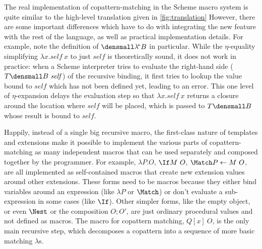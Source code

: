 
The real implementation of copattern-matching in the Scheme macro system is quite similar to the high-level translation given in \cref{fig:translation}
However, there are some important differences which have to do with integrating the new feature with the rest of the language, as well as practical implementation details.
For example, note the definition of $\den{\lamstar B}$ in particular.
While the $\eta$-equality simplifying $\lambda x. \mathit{self} ~ x$ to just $\mathit{self}$ is theoretically sound, it does not work in practice:
when a Scheme interpreter tries to evaluate the right-hand side ($T\den{B}~\mathit{self}$) of the recursive binding, it first tries to lookup the value bound to $\mathit{self}$ which has not been defined yet, leading to an error.
This one level of $\eta$-expansion delays the evaluation step so that $\lambda x. \mathit{self} ~ x$ returns a closure around the location where $\mathit{self}$ will be placed, which is passed to $T\den{B}$ whose result is bound to $\mathit{self}$.

Happily, instead of a single big recursive macro, the first-class nature of templates and extensions make it possible to implement the various parts of copattern-matching as many independent macros that can be used separately and composed together by the programmer.  For example, $\lambda P. O$, $\If M ~ O$, $\Match P \gets M ~ O$, \etc are all implemented as self-contained macros that create new extension values around other extensions.
These forms need to be macros because they either bind variables around an expression (like $\lambda P$ or $\Match$) or don't evaluate a sub-expression in some cases (like $\If$).
Other simpler forms, like the empty object, or even $\Nest$ or the composition $O; O'$, are just ordinary procedural values and not defined as macros.
The macro for copattern matching, $Q[x]~O$, is the only main recursive step, which decomposes a copattern into a sequence of more basic matching $\lambda$s.

